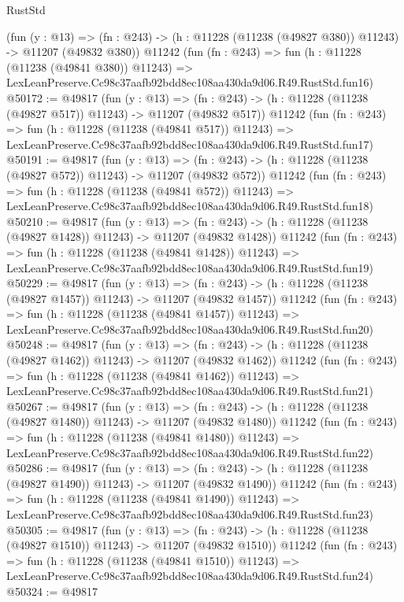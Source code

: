 \begin{lexlean}{RustStd}
\begin{coremodule}
    (fun (y : @13) =>
    (fn : @243) -> (h : @11228 (@11238 (@49827 @380)) @11243) -> @11207 (@49832 @380))
    @11242
    (fun (fn : @243) =>
    fun (h : @11228 (@11238 (@49841 @380)) @11243) =>
    LexLeanPreserve.Cc98c37aafb92bdd8ec108aa430da9d06.R49.RustStd.fun16)
@50172 := @49817
    (fun (y : @13) =>
    (fn : @243) -> (h : @11228 (@11238 (@49827 @517)) @11243) -> @11207 (@49832 @517))
    @11242
    (fun (fn : @243) =>
    fun (h : @11228 (@11238 (@49841 @517)) @11243) =>
    LexLeanPreserve.Cc98c37aafb92bdd8ec108aa430da9d06.R49.RustStd.fun17)
@50191 := @49817
    (fun (y : @13) =>
    (fn : @243) -> (h : @11228 (@11238 (@49827 @572)) @11243) -> @11207 (@49832 @572))
    @11242
    (fun (fn : @243) =>
    fun (h : @11228 (@11238 (@49841 @572)) @11243) =>
    LexLeanPreserve.Cc98c37aafb92bdd8ec108aa430da9d06.R49.RustStd.fun18)
@50210 := @49817
    (fun (y : @13) =>
    (fn : @243) -> (h : @11228 (@11238 (@49827 @1428)) @11243) -> @11207 (@49832 @1428))
    @11242
    (fun (fn : @243) =>
    fun (h : @11228 (@11238 (@49841 @1428)) @11243) =>
    LexLeanPreserve.Cc98c37aafb92bdd8ec108aa430da9d06.R49.RustStd.fun19)
@50229 := @49817
    (fun (y : @13) =>
    (fn : @243) -> (h : @11228 (@11238 (@49827 @1457)) @11243) -> @11207 (@49832 @1457))
    @11242
    (fun (fn : @243) =>
    fun (h : @11228 (@11238 (@49841 @1457)) @11243) =>
    LexLeanPreserve.Cc98c37aafb92bdd8ec108aa430da9d06.R49.RustStd.fun20)
@50248 := @49817
    (fun (y : @13) =>
    (fn : @243) -> (h : @11228 (@11238 (@49827 @1462)) @11243) -> @11207 (@49832 @1462))
    @11242
    (fun (fn : @243) =>
    fun (h : @11228 (@11238 (@49841 @1462)) @11243) =>
    LexLeanPreserve.Cc98c37aafb92bdd8ec108aa430da9d06.R49.RustStd.fun21)
@50267 := @49817
    (fun (y : @13) =>
    (fn : @243) -> (h : @11228 (@11238 (@49827 @1480)) @11243) -> @11207 (@49832 @1480))
    @11242
    (fun (fn : @243) =>
    fun (h : @11228 (@11238 (@49841 @1480)) @11243) =>
    LexLeanPreserve.Cc98c37aafb92bdd8ec108aa430da9d06.R49.RustStd.fun22)
@50286 := @49817
    (fun (y : @13) =>
    (fn : @243) -> (h : @11228 (@11238 (@49827 @1490)) @11243) -> @11207 (@49832 @1490))
    @11242
    (fun (fn : @243) =>
    fun (h : @11228 (@11238 (@49841 @1490)) @11243) =>
    LexLeanPreserve.Cc98c37aafb92bdd8ec108aa430da9d06.R49.RustStd.fun23)
@50305 := @49817
    (fun (y : @13) =>
    (fn : @243) -> (h : @11228 (@11238 (@49827 @1510)) @11243) -> @11207 (@49832 @1510))
    @11242
    (fun (fn : @243) =>
    fun (h : @11228 (@11238 (@49841 @1510)) @11243) =>
    LexLeanPreserve.Cc98c37aafb92bdd8ec108aa430da9d06.R49.RustStd.fun24)
@50324 := @49817

\end{coremodule}
\end{lexlean}
